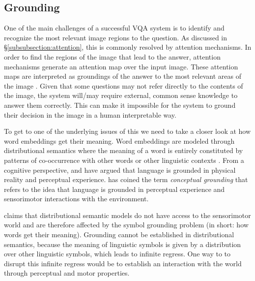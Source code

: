 \documentclass{article}
\begin{document}
\subsection{Grounding}

One of the main challenges of a successful VQA system is to identify and recognize the most relevant image regions to the question. As discussed in \S \ref{subsubsection:attention}, this is commonly resolved by attention mechanisms. In order to find the regions of the image that lead to the answer, attention mechanisms generate an attention map over the input image. These attention maps are interpreted as groundings of the answer to the most relevant areas of the image \citep{zhang2019interpretable}. Given that some questions may not refer directly to the contents of the image, the system will/may require external, common sense knowledge to answer them correctly. This can make it impossible for the system to ground their decision in the image in a human interpretable way.

To get to one of the underlying issues of this we need to take a closer look at how word embeddings get their meaning. Word embeddings are modeled through distributional semantics where the meaning of a word is entirely constituted by patterns of co-occurrence with other words or other linguistic contexts \citep{baroni2016grounding}. From a cognitive perspective, \cite{barsalou1999perceptual} and \cite{fincher2001perceptual} have argued that language is grounded in physical reality and perceptual experience. \cite{barsalou2008grounded} has coined the term \textit{conceptual grounding} that refers to the idea that language is grounded in perceptual experience and sensorimotor interactions with the environment.

\cite{baroni2016grounding} claims that distributional semantic models do not have access to the sensorimotor world and are therefore affected by the symbol grounding problem \cite{harnad1990symbol} (in short: how words get their meaning). Grounding cannot be established in distributional semantics, because the meaning of linguistic symbols is given by a distribution over other linguistic symbols, which leads to infinite regress. One way to to disrupt this infinite regress would be to establish an interaction with the world through perceptual and motor properties.
\end{document}

